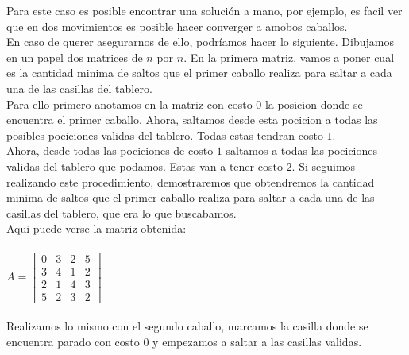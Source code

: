 Para este caso es posible encontrar una soluci\'on a mano, por ejemplo, es facil ver que en dos movimientos es posible hacer converger a amobos caballos.
\\
En caso de querer asegurarnos de ello, podr\'iamos hacer lo siguiente. Dibujamos en un papel dos matrices de $n$ por $n$. En la primera matriz, vamos a poner cual es la cantidad minima de saltos que el primer caballo realiza para saltar a cada una de las casillas del tablero. 
\\
Para ello primero anotamos en la matriz con costo $0$ la posicion donde se encuentra el primer caballo. Ahora, saltamos desde esta pocicion a todas las posibles pociciones validas del tablero. Todas estas tendran costo $1$.
\\
Ahora, desde todas las pociciones de costo $1$ saltamos a todas las pociciones validas del tablero que podamos. Estas van a tener costo $2$. Si seguimos realizando este procedimiento, demostraremos que obtendremos la cantidad minima de saltos que el primer caballo realiza para saltar a cada una de las casillas del tablero, que era lo que buscabamos.
\\
Aqui puede verse la matriz obtenida:
\\
\\
$A = \begin{bmatrix}
      0 & 3 & 2 & 5   \\[0.3em]
      3 & 4 & 1 & 2   \\[0.3em]
      2 & 1 & 4 & 3   \\[0.3em]
      5 & 2 & 3 & 2 
\end{bmatrix}$
\\
\\
Realizamos lo mismo con el segundo caballo, marcamos la casilla donde se encuentra parado con costo $0$ y empezamos a saltar a las casillas validas.

